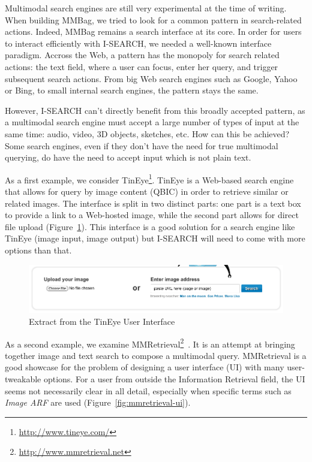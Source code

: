 \documentclass[runningheads,a4paper]{llncs} \usepackage[utf8]{inputenc}
\begin{document}
Multimodal search engines are still very experimental at the time of writing. When building MMBag, we tried to look for a common pattern in search-related actions. Indeed, MMBag remains a search interface at its core. In order for users to interact efficiently with \mbox{I-SEARCH}, we needed a well-known interface paradigm. Accross the Web, a pattern has the monopoly for search related actions:  the text field, where a user can focus, enter her query, and trigger subsequent search actions. From big Web search engines such as Google, Yahoo or Bing, to small internal search engines, the pattern stays the same. 

However, \mbox{I-SEARCH} can't directly benefit from this broadly accepted pattern, as a multimodal search engine must accept a large number of types of input at the same time: audio, video, 3D objects, sketches, etc. How can this be achieved? Some search engines, even if they don't have the need for true multimodal querying, do have the need to accept input which is not plain text.

As a first example, we consider TinEye\footnote{\url{http://www.tineye.com/}}. TinEye is a Web-based search engine that allows for query by image content (QBIC) in order to retrieve similar or related images. The interface is split in two distinct parts: one part is a text box to provide a link to a Web-hosted image, while the second part allows for direct file upload (Figure~\ref{fig:tineye-ui}). This interface is a good solution for a search engine like TinEye (image input, image output) but \mbox{I-SEARCH} will need to come with more options than that.
\begin{figure}[h!]
  \centering
    \includegraphics[width=0.8\linewidth]{resources/tineye-UI.png}
  \caption{Extract from the TinEye User Interface}
  \label{fig:tineye-ui}
\end{figure}

As a second example, we examine MMRetrieval\footnote{\url{http://www.mmretrieval.net}}~\cite{mmretrieval}. It is an attempt at bringing together image and text search to compose a multimodal query. MMRetrieval is a good showcase for the problem of designing a user interface (UI) with many user-tweakable options. For a user from outside the Information Retrieval field, the UI seems not necessarily clear in all detail, especially when specific terms such as \emph{Image ARF} are used (Figure~\ref{fig:mmretrieval-ui}).
\end{document}
